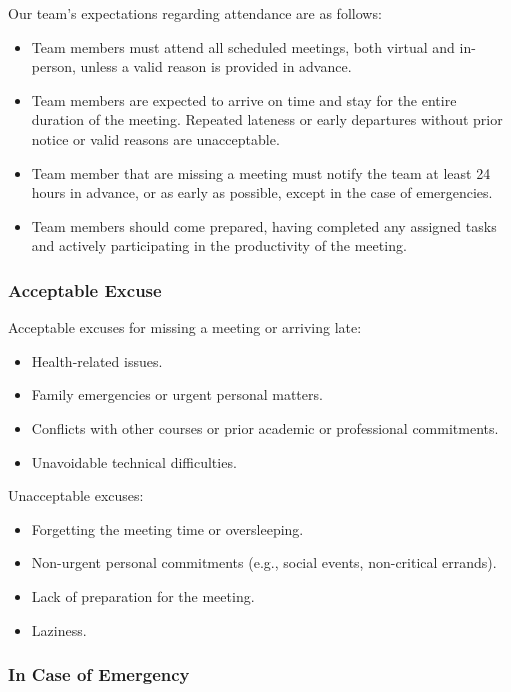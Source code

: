 \documentclass{article}
\begin{document}
Our team's expectations regarding attendance are as follows:
\begin{itemize}
    \item Team members must attend all scheduled meetings, both virtual and in-person, unless a valid reason is provided in advance.
    \item Team members are expected to arrive on time and stay for the entire duration of the meeting. Repeated lateness or early departures without prior notice or valid reasons are unacceptable.
    \item Team member that are missing a meeting must notify the team at least 24 hours in advance, or as early as possible, except in the case of emergencies.
    \item Team members should come prepared, having completed any assigned tasks and actively participating in the productivity of the meeting.
\end{itemize}

\subsubsection*{Acceptable Excuse}

Acceptable excuses for missing a meeting or arriving late:
\begin{itemize}
    \item Health-related issues.
    \item Family emergencies or urgent personal matters.
    \item Conflicts with other courses or prior academic or professional commitments.
    \item Unavoidable technical difficulties.
\end{itemize}
Unacceptable excuses:
\begin{itemize}
    \item Forgetting the meeting time or oversleeping.
    \item Non-urgent personal commitments (e.g., social events, non-critical errands).
    \item Lack of preparation for the meeting.
    \item Laziness.
\end{itemize}

\subsubsection*{In Case of Emergency}
\end{document}
